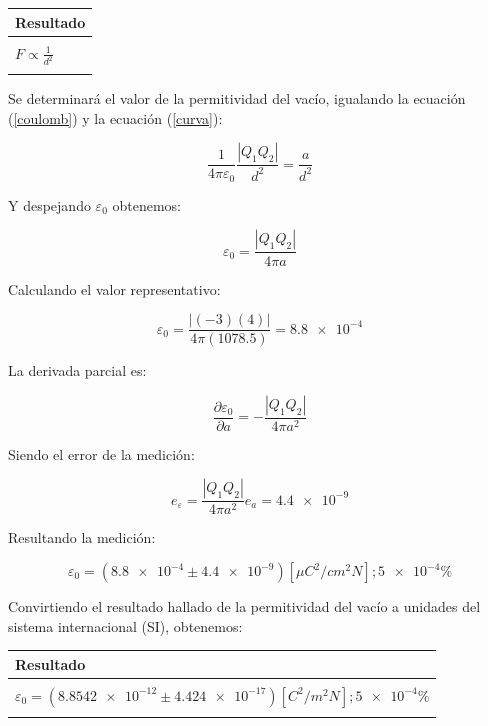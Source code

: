 \documentclass[letter,11pt]{article}
\begin{document}
\begin{center}
\begin{tabular}{|>{\centering}m{9.2cm}<{\centering}|}
\hline
\textbf{Resultado} 
\tabularnewline \hline
\\
\Large{$F \propto \frac{1}{d^2}$} \tabularnewline
\\
\hline
\end{tabular}
\end{center}

Se determinará el valor de la permitividad del vacío, igualando la ecuación
(\ref{coulomb}) y la ecuación (\ref{curva}):

\begin{equation*}
    \frac{1}{4 \pi \varepsilon_0} \frac{| Q_1 Q_2 |}{d^2} = \frac{a}{d^2}
\end{equation*}

Y despejando $\varepsilon_0$ obtenemos:

\begin{equation}
    \varepsilon_0 = \frac{| Q_1 Q_2 |}{4 \pi a}
\end{equation}

Calculando el valor representativo:

\begin{equation*}
    \varepsilon_0 = \frac{|(-3)(4)|}{4 \pi (1078.5)} = \num{8.8e-4}
\end{equation*}

La derivada parcial es:

\begin{equation*}
    \frac{\partial{\varepsilon_0}}{\partial{a}} = -\frac{|Q_1 Q_2|}{4 \pi a^2}
\end{equation*}

Siendo el error de la medición:

\begin{equation}
    e_\varepsilon = \frac{|Q_1 Q_2|}{4 \pi a^2} e_a = \num{4.4e-9}
\end{equation}

Resultando la medición:

\begin{equation*}
    \varepsilon_0 = (\num{8.8e-4} \pm \num{4.4e-9}) [\mu C^2/cm^2 N]; \num{5e-4} \%
\end{equation*}

Convirtiendo el resultado hallado de la permitividad del vacío a unidades del
sistema internacional (SI), obtenemos:

\begin{center}
\begin{tabular}{|>{\centering}m{11.0cm}<{\centering}|}
\hline
\textbf{Resultado}
\tabularnewline \hline
\\
$\varepsilon_0 = (\num{8.8542e-12} \pm \num{4.424e-17}) [C^2/m^2 N]; \num{5e-4} \%$ \tabularnewline
\\
\hline
\end{tabular}
\end{center}
\end{document}
